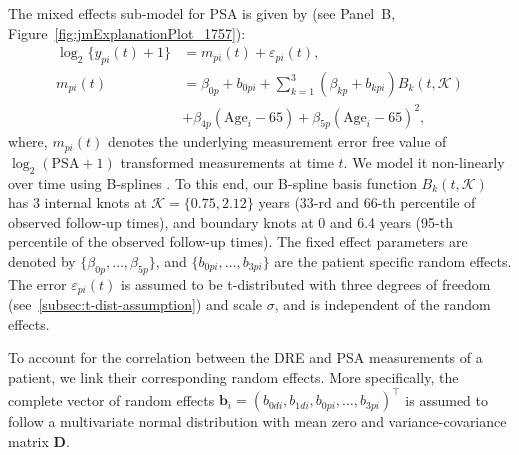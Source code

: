 The mixed effects sub-model for PSA is given by (see Panel~B, Figure~\ref{fig:jmExplanationPlot_1757}):
\begin{equation}
\label{eq:long_model_psa}
\begin{split}
    \log_2 \big\{y_{pi}(t) + 1\big\} &= m_{pi}(t) + \varepsilon_{pi}(t),\\
    m_{pi}(t) &= \beta_{0p} + b_{0pi} + \sum_{k=1}^3 (\beta_{kp} + b_{kpi})  B_k(t,\mathcal{K})\\ 
    &+ \beta_{4p} (\mbox{Age}_i-65) + \beta_{5p} (\mbox{Age}_i-65)^2,
    \end{split}
\end{equation}
where, $m_{pi}(t)$ denotes the underlying measurement error free value of $\log_2 (\mbox{PSA} + 1)$ transformed \citep{pearson1994mixed,lin2000latent} measurements at time $t$. We model it non-linearly over time using B-splines \citep{de1978practical}. To this end, our B-spline basis function $B_k(t, \mathcal{K})$ has 3 internal knots at $\mathcal{K} = \{0.75, 2.12\}$ years (33-rd and 66-th percentile of observed follow-up times), and boundary knots at 0 and 6.4 years (95-th percentile of the observed follow-up times). The fixed effect parameters are denoted by ${\{\beta_{0p},\ldots,\beta_{5p}\}}$, and ${\{b_{0pi}, \ldots, b_{3pi}\}}$ are the patient specific random effects. The error $\varepsilon_{pi}(t)$ is assumed to be t-distributed with three degrees of freedom (see~\ref{subsec:t-dist-assumption}) and scale $\sigma$, and is independent of the random effects. 

To account for the correlation between the DRE and PSA measurements of a patient, we link their corresponding random effects. More specifically, the complete vector of random effects ${\boldsymbol{b}_i = (b_{0di}, b_{1di}, b_{0pi}, \ldots, b_{3pi})^\top}$ is assumed to follow a multivariate normal distribution with mean zero and variance-covariance matrix $\boldsymbol{D}$.

